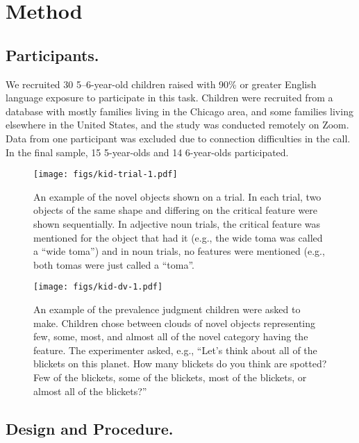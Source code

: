 \documentclass{ucetd}
\begin{document}
\hypertarget{method-3}{%
\section{Method}\label{method-3}}

\hypertarget{participants.-2}{%
\subsection{Participants.}\label{participants.-2}}

We recruited 30 5--6-year-old children raised with 90\% or greater
English language exposure to participate in this task. Children were
recruited from a database with mostly families living in the Chicago
area, and some families living elsewhere in the United States, and the
study was conducted remotely on Zoom. Data from one participant was
excluded due to connection difficulties in the call. In the final
sample, 15 5-year-olds and 14 6-year-olds participated.

\begin{figure}
\centering
\texttt{[image: figs/kid-trial-1.pdf]}
\caption{An example of the novel objects shown on a trial. In each
trial, two objects of the same shape and differing on the critical
feature were shown sequentially. In adjective noun trials, the critical
feature was mentioned for the object that had it (e.g., the wide toma
was called a ``wide toma'') and in noun trials, no features were
mentioned (e.g., both tomas were just called a ``toma''.}
\end{figure}

\begin{figure}
\centering
\texttt{[image: figs/kid-dv-1.pdf]}
\caption{An example of the prevalence judgment children were asked to
make. Children chose between clouds of novel objects representing few,
some, most, and almost all of the novel category having the feature. The
experimenter asked, e.g., ``Let's think about all of the blickets on
this planet. How many blickets do you think are spotted? Few of the
blickets, some of the blickets, most of the blickets, or almost all of
the blickets?''}
\end{figure}

\hypertarget{design-and-procedure.}{%
\subsection{Design and Procedure.}\label{design-and-procedure.}}
\end{document}

